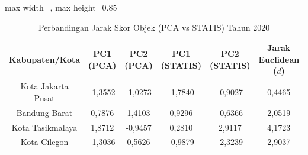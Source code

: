 \begin{table}[H]
\centering
\caption{Perbandingan Jarak Skor Objek (PCA vs STATIS) Tahun 2020} \label{tab:sample1jarak_skor_2020}
\begin{adjustbox}{max width=\textwidth, max height=0.85\textheight}
\begin{tabular}{|c|c|c|c|c|c|}
\hline
\textbf{Kabupaten/Kota} & \textbf{PC1 (PCA)} & \textbf{PC2 (PCA)} & \textbf{PC1 (STATIS)} & \textbf{PC2 (STATIS)} & \textbf{Jarak Euclidean ($d$)} \\
\hline
Kota Jakarta Pusat & -1,3552 & -1,0273 & -1,7840 & -0,9027 & 0,4465 \\
Bandung Barat & 0,7876 & 1,4103 & 0,9296 & -0,6366 & 2,0519 \\
Kota Tasikmalaya & 1,8712 & -0,9457 & 0,2810 & 2,9117 & 4,1723 \\
Kota Cilegon & -1,3036 & 0,5626 & -0,9879 & -2,3239 & 2,9037 \\
\hline
\end{tabular}
\end{adjustbox}
\end{table}